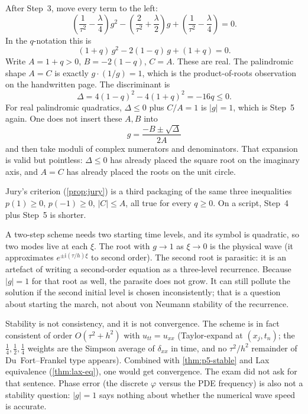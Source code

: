 After Step~3, move every term to the left:
\[
\left(\frac{1}{\tau^2}-\frac{\lambda}{4}\right)g^2
-
\left(\frac{2}{\tau^2}+\frac{\lambda}{2}\right)g
+
\left(\frac{1}{\tau^2}-\frac{\lambda}{4}\right)
=
0.
\]
In the \(q\)-notation this is
\[
(1+q)\,g^2-2(1-q)\,g+(1+q)=0.
\]
Write \(A=1+q>0\), \(B=-2(1-q)\), \(C=A\). These are real. The palindromic shape \(A=C\) is exactly \(g\cdot(1/g)=1\), which is the product-of-roots observation on the handwritten page. The discriminant is
\[
\Delta
=
4(1-q)^2-4(1+q)^2
=
-16q
\le 0.
\]
For real palindromic quadratics, \(\Delta\le 0\) plus \(C/A=1\) is \(|g|=1\), which is Step~5 again. One does not insert these \(A,B\) into
\[
g=\frac{-B\pm\sqrt{\Delta}}{2A}
\]
and then take moduli of complex numerators and denominators. That expansion is valid but pointless: \(\Delta\le 0\) has already placed the square root on the imaginary axis, and \(A=C\) has already placed the roots on the unit circle.

Jury's criterion (\cref{prop:jury}) is a third packaging of the same three inequalities \(p(1)\ge 0\), \(p(-1)\ge 0\), \(|C|\le A\), all true for every \(q\ge 0\). On a script, Step~4 plus Step~5 is shorter.

\begin{remark}
\label{rem:p5-two-roots}
A two-step scheme needs two starting time levels, and its symbol is quadratic, so two modes live at each \(\xi\). The root with \(g\to 1\) as \(\xi\to 0\) is the physical wave (it approximates \(e^{\pm\mathrm i(\tau/h)\xi}\) to second order). The second root is parasitic: it is an artefact of writing a second-order equation as a three-level recurrence. Because \(|g|=1\) for that root as well, the parasite does not grow. It can still pollute the solution if the second initial level is chosen inconsistently; that is a question about starting the march, not about von Neumann stability of the recurrence.
\end{remark}

\begin{remark}
\label{rem:p5-not-proved}
Stability is not consistency, and it is not convergence. The scheme is in fact consistent of order \(O(\tau^2+h^2)\) with \(u_{tt}=u_{xx}\) (Taylor-expand at \((x_j,t_n)\); the \(\frac14,\frac12,\frac14\) weights are the Simpson average of \(\delta_{xx}\) in time, and no \(\tau^2/h^2\) remainder of Du~Fort--Frankel type appears). Combined with \cref{thm:p5-stable} and Lax equivalence (\cref{thm:lax-eq}), one would get convergence. The exam did not ask for that sentence. Phase error (the discrete \(\varphi\) versus the PDE frequency) is also not a stability question: \(|g|=1\) says nothing about whether the numerical wave speed is accurate.
\end{remark}

